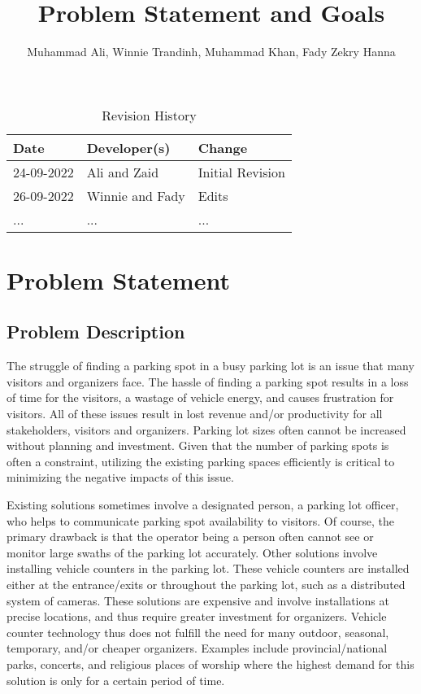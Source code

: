 \documentclass{article}
\title{Problem Statement and Goals\\\progname}
\author{\authname Muhammad Ali, Winnie Trandinh, Muhammad Khan, Fady Zekry Hanna}
\date{}
\begin{document}
\maketitle

\begin{table}[hp]
\caption{Revision History} \label{TblRevisionHistory}
\begin{tabularx}{\textwidth}{llX}
\toprule
\textbf{Date} & \textbf{Developer(s)} & \textbf{Change}\\
\midrule
24-09-2022 & Ali and Zaid & Initial Revision\\
26-09-2022 & Winnie and Fady & Edits \\
... & ... & ...\\
\bottomrule
\end{tabularx}
\end{table}

\section{Problem Statement}
\subsection{Problem Description}

\indent The struggle of finding a parking spot in a busy parking lot is an issue that many visitors and organizers face. The hassle of finding a parking spot results in a loss of time for the visitors, a wastage of vehicle energy, and causes frustration for visitors. All of these issues result in lost revenue and/or productivity for all stakeholders, visitors and organizers. Parking lot sizes often cannot be increased without planning and investment. Given that the number of parking spots is often a constraint, utilizing the existing parking spaces efficiently is critical to minimizing the negative impacts of this issue.


\indent Existing solutions sometimes involve a designated person, a parking lot officer, who helps to communicate parking spot availability to visitors. Of course, the primary drawback is that the operator being a person often cannot see or monitor large swaths of the parking lot accurately. Other solutions involve installing vehicle counters in the parking lot. These vehicle counters are installed either at the entrance/exits or throughout the parking lot, such as a distributed system of cameras.  These solutions are expensive and involve installations at precise locations, and thus require greater investment for organizers. Vehicle counter technology thus does not fulfill the need for many outdoor, seasonal, temporary, and/or cheaper organizers.  Examples include provincial/national parks, concerts, and religious places of worship where the highest demand for this solution is only for a certain period of time. 
\end{document}
